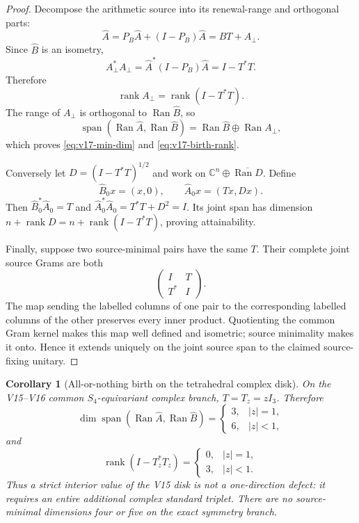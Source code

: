 \documentclass[11pt]{article}
\newtheorem{corollary}[corollary]{Corollary}
\theoremstyle{definition}
\theoremstyle{remark}
\newcommand{\rank}{\operatorname{rank}}
\newcommand{\Span}{\operatorname{span}}
\begin{document}
\begin{proof}
Decompose the arithmetic source into its renewal-range and orthogonal parts:
\[
 \widehat A=P_B\widehat A+(I-P_B)\widehat A
 =\widehat BT+A_\perp.
\]
Since $\widehat B$ is an isometry,
\[
 A_\perp^*A_\perp
 =\widehat A^*(I-P_B)\widehat A
 =I-T^*T.
\]
Therefore
\[
 \rank A_\perp=\rank(I-T^*T).
\]
The range of $A_\perp$ is orthogonal to $\operatorname{Ran}\widehat B$, so
\[
 \Span(\operatorname{Ran}\widehat A,\operatorname{Ran}\widehat B)
 =\operatorname{Ran}\widehat B\oplus\operatorname{Ran} A_\perp,
\]
which proves \eqref{eq:v17-min-dim} and \eqref{eq:v17-birth-rank}.

Conversely let $D=(I-T^*T)^{1/2}$ and work on
$\mathbb C^n\oplus\overline{\operatorname{Ran} D}$.  Define
\[
 \widehat B_0x=(x,0),
 \qquad
 \widehat A_0x=(Tx,Dx).
\]
Then
$\widehat B_0^*\widehat A_0=T$ and
$\widehat A_0^*\widehat A_0=T^*T+D^2=I$.
Its joint span has dimension
$n+\rank D=n+\rank(I-T^*T)$, proving attainability.

Finally, suppose two source-minimal pairs have the same $T$.  Their complete
joint source Grams are both
\[
 \begin{pmatrix}I&T\\T^*&I\end{pmatrix}.
\]
The map sending the labelled columns of one pair to the corresponding labelled
columns of the other preserves every inner product.  Quotienting the common
Gram kernel makes this map well defined and isometric; source minimality makes
it onto.  Hence it extends uniquely on the joint source span to the claimed
source-fixing unitary.
\end{proof}

\begin{corollary}[All-or-nothing birth on the tetrahedral complex disk]
\label{cor:v17-disk-birth}
On the V15--V16 common $S_4$-equivariant complex branch,
$T=T_z=zI_3$.  Therefore
\[
 \boxed{
 \dim\Span(\operatorname{Ran}\widehat A,\operatorname{Ran}\widehat B)
 =\begin{cases}
 3,&|z|=1,\\
 6,&|z|<1,
 \end{cases}}
 \tag{V17.3}\label{eq:v17-disk-dim}
\]
and
\[
 \boxed{
 \rank(I-T_z^*T_z)
 =\begin{cases}
 0,&|z|=1,\\
 3,&|z|<1.
 \end{cases}}
 \tag{V17.4}\label{eq:v17-disk-rank}
\]
Thus a strict interior value of the V15 disk is not a one-direction defect: it
requires an entire additional complex standard triplet.  There are no
source-minimal dimensions four or five on the exact symmetry branch.
\end{corollary}
\end{document}
